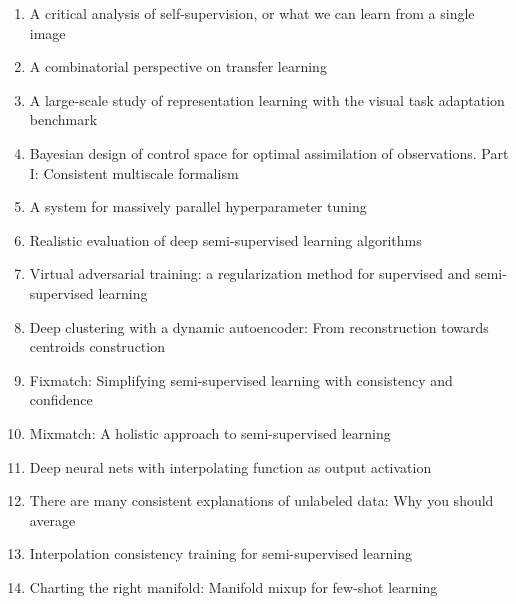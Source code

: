 \documentclass[acmlarge]{acmart}
\begin{document}
\begin{enumerate}
	\item A critical analysis of self-supervision, or what we can learn from a single image \cite{asano2019critical} 

	\item A combinatorial perspective on transfer learning \cite{wang2020combinatorial} 

	\item A large-scale study of representation learning with the visual task adaptation benchmark \cite{zhai2019large} 

	\item Bayesian design of control space for optimal assimilation of observations. Part I: Consistent multiscale formalism \cite{bocquet2011bayesian} 

	\item A system for massively parallel hyperparameter tuning \cite{li2020system} 

	\item Realistic evaluation of deep semi-supervised learning algorithms \cite{oliver2018realistic} 

	\item Virtual adversarial training: a regularization method for supervised and semi-supervised learning \cite{miyato2018virtual} 

	\item Deep clustering with a dynamic autoencoder: From reconstruction towards centroids construction \cite{mrabah2020deep} 

	\item Fixmatch: Simplifying semi-supervised learning with consistency and confidence \cite{sohn2020fixmatch} 

	\item Mixmatch: A holistic approach to semi-supervised learning \cite{berthelot2019mixmatch} 

	\item Deep neural nets with interpolating function as output activation \cite{wang2018deep} 

	\item There are many consistent explanations of unlabeled data: Why you should average \cite{athiwaratkun2018there} 

	\item Interpolation consistency training for semi-supervised learning \cite{verma2019interpolation} 

	\item Charting the right manifold: Manifold mixup for few-shot learning \cite{mangla2020charting} 


\end{enumerate}
\end{document}
